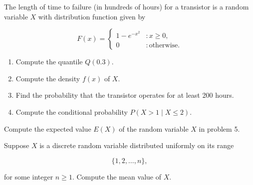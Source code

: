 \documentclass[12pt,reqno]{amsart}
\begin{document}
\newpage
\prob The length of time to failure (in hundreds of hours) for a transistor is a random variable $X$ with
distribution function given by

	\[
	F(x) = \begin{cases}
	1 - e^{-x^2} & : x\geq 0, \\
	0 & : \text{otherwise}.
	\end{cases}
	\]

\medskip
\begin{enumerate}
\item Compute the quantile $Q(0.3)$.\vfill
\item Compute the density $f(x)$ of $X$.\vfill
\item Find the probability that the transistor operates for at least 200 hours.\vfill
\item Compute the conditional probability $P(X>1 \mid X\leq 2)$.\vfill
\end{enumerate}



















\bigskip
\prob Compute the expected value $E(X)$ of the random variable $X$ in problem 5.\vfill



























\bigskip
\prob Suppose $X$ is a discrete random variable distributed uniformly on its range
    
	\[
	\{1,2,\ldots,n\},
	\]

for some integer $n\geq 1$. Compute the mean value of $X$.\vfill
\end{document}
